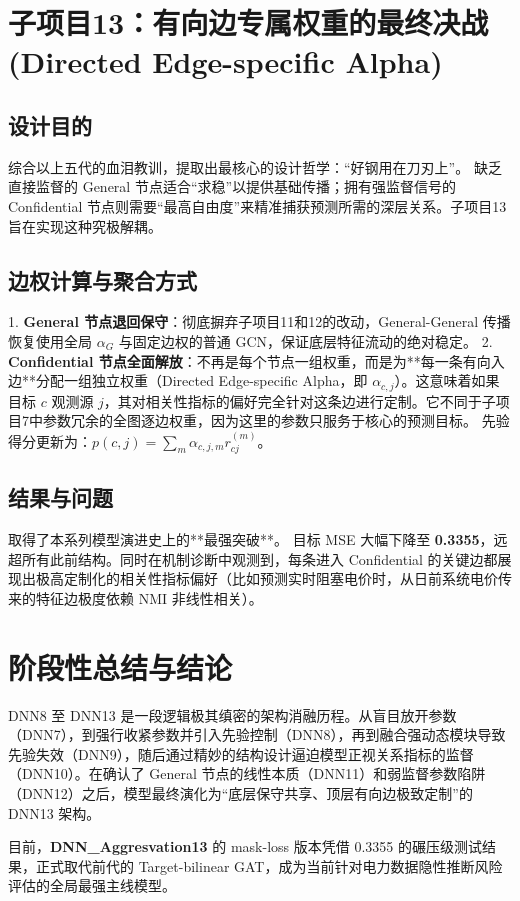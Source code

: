 \documentclass[UTF8]{ctexart}
\begin{document}
\section{子项目13：有向边专属权重的最终决战 (Directed Edge-specific Alpha)}

\subsection{设计目的}
综合以上五代的血泪教训，提取出最核心的设计哲学：“好钢用在刀刃上”。
缺乏直接监督的 General 节点适合“求稳”以提供基础传播；拥有强监督信号的 Confidential 节点则需要“最高自由度”来精准捕获预测所需的深层关系。子项目13旨在实现这种究极解耦。

\subsection{边权计算与聚合方式}
1. \textbf{General 节点退回保守}：彻底摒弃子项目11和12的改动，General-General 传播恢复使用全局 $\alpha_G$ 与固定边权的普通 GCN，保证底层特征流动的绝对稳定。
2. \textbf{Confidential 节点全面解放}：不再是每个节点一组权重，而是为**每一条有向入边**分配一组独立权重（Directed Edge-specific Alpha，即 $\alpha_{c,j}$）。这意味着如果目标 $c$ 观测源 $j$，其对相关性指标的偏好完全针对这条边进行定制。它不同于子项目7中参数冗余的全图逐边权重，因为这里的参数只服务于核心的预测目标。
先验得分更新为：$p(c,j) = \sum_m \alpha_{c,j,m} r_{cj}^{(m)}$。

\subsection{结果与问题}
取得了本系列模型演进史上的**最强突破**。
目标 MSE 大幅下降至 \textbf{0.3355}，远超所有此前结构。同时在机制诊断中观测到，每条进入 Confidential 的关键边都展现出极高定制化的相关性指标偏好（比如预测实时阻塞电价时，从日前系统电价传来的特征边极度依赖 NMI 非线性相关）。

\section{阶段性总结与结论}

DNN8 至 DNN13 是一段逻辑极其缜密的架构消融历程。从盲目放开参数（DNN7），到强行收紧参数并引入先验控制（DNN8），再到融合强动态模块导致先验失效（DNN9），随后通过精妙的结构设计逼迫模型正视关系指标的监督（DNN10）。在确认了 General 节点的线性本质（DNN11）和弱监督参数陷阱（DNN12）之后，模型最终演化为“底层保守共享、顶层有向边极致定制”的 DNN13 架构。

目前，\textbf{DNN\_Aggresvation13} 的 mask-loss 版本凭借 0.3355 的碾压级测试结果，正式取代前代的 Target-bilinear GAT，成为当前针对电力数据隐性推断风险评估的全局最强主线模型。
\end{document}
